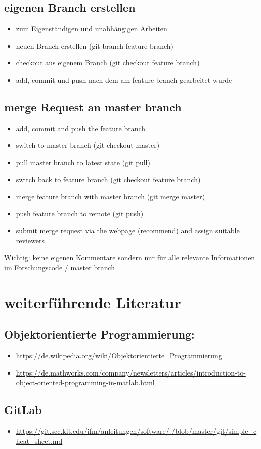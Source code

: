 \documentclass[12pt,bibstyle=none,pagenumberinfooter]{ifmdocument}
\begin{document}
	\subsection{eigenen Branch erstellen}
	\begin{itemize}
	\item zum Eigenst\"andigen und unabh\"angigen Arbeiten 
	\item neuen Branch erstellen (git branch feature branch)
	\item checkout aus eigenem Branch (git checkout feature branch)
	\item add, commit und push nach dem am feature branch gearbeitet wurde
\end{itemize}

	\subsection{merge Request an master branch}
	\begin{itemize}
	\item add, commit and push the feature branch
	\item switch to master branch (git checkout master)
	\item pull master branch to latest state (git pull)
	\item switch back to feature branch (git checkout feature branch)
	\item merge feature branch with master branch (git merge master)
	\item push feature branch to remote (git push)
	\item submit merge request via the webpage (recommend) and assign suitable reviewers
\end{itemize}
Wichtig:
keine eigenen Kommentare sondern nur f\"ur alle relevante Informationen im Forschungscode / master branch 

	\section{weiterf\"uhrende Literatur}
	\subsection{Objektorientierte Programmierung:}
	\begin{itemize}
		\item \url{https://de.wikipedia.org/wiki/Objektorientierte_Programmierung}
		\item \url{https://de.mathworks.com/company/newsletters/articles/introduction-to-object-oriented-programming-in-matlab.html}
	\end{itemize}
	\subsection{GitLab}
		\begin{itemize}
			\item \url{https://git.scc.kit.edu/ifm/anleitungen/software/-/blob/master/git/simple_cheat_sheet.md}
		\end{itemize}
\end{document}
